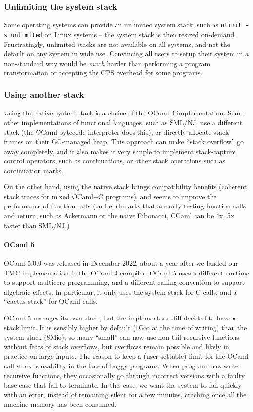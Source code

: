 \subsubsection{Unlimiting the system stack}

Some operating systems can provide an unlimited system stack; such as \texttt{ulimit -s unlimited} on Linux systems -- the system stack is then resized on-demand.
Frustratingly, unlimited stacks are not available on all systems, and not the default on any system in wide use.
Convincing all users to setup their system in a non-standard way would be \emph{much} harder than performing a program transformation or accepting the CPS overhead for some programs.

\subsubsection{Using another stack}

Using the native system stack is a choice of the OCaml 4 implementation.
Some other implementations of functional languages, such as SML/NJ, use a different stack (the OCaml bytecode interpreter does this), or directly allocate stack frames on their GC-managed heap.
This approach can make ``stack overflow'' go away completely, and it also makes it very simple to implement stack-capture control operators, such as continuations, or other stack operations such as continuation marks.

On the other hand, using the native stack brings compatibility benefits (coherent stack traces for mixed OCaml+C programs), and seems to improve the performance of function calls (on benchmarks that are only testing function calls and return, such as Ackermann or the naive Fibonacci, OCaml can be 4x, 5x faster than SML/NJ.)

\paragraph{OCaml 5}

OCaml 5.0.0 was released in December 2022, about a year after we landed our TMC implementation in the OCaml 4 compiler.
OCaml 5 uses a different runtime to support multicore programming, and a different calling convention to support algebraic effects.
In particular, it only uses the system stack for C calls, and a ``cactus stack'' for OCaml calls.

OCaml 5 manages its own stack, but the implementors still decided to have a stack limit.
It is sensibly higher by default (1Gio at the time of writing) than the system stack (8Mio), so many ``small'' can now use non-tail-recursive functions without fears of stack overflows, but overflows remain possible and likely in practice on large inputs.
The reason to keep a (user-settable) limit for the OCaml call stack is usability in the face of buggy programs.
When programmers write recursive functions, they occasionally go through incorrect versions with a faulty base case that fail to terminate.
In this case, we want the system to fail quickly with an error, instead of remaining silent for a few minutes, crashing once all the machine memory has been consumed.

